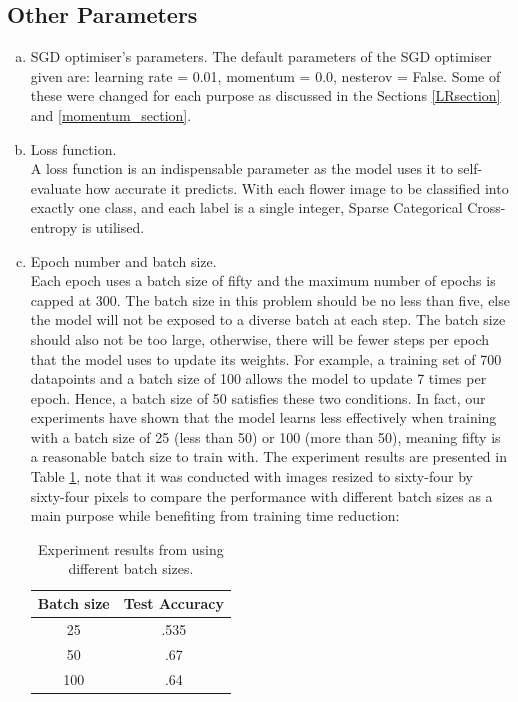 \documentclass[]{article}
\begin{document}
\subsection{Other Parameters}  \label{other_parameter}

\begin{enumerate}[(a)]
    \item SGD optimiser's parameters. \newline
    The default parameters of the SGD optimiser given are: learning rate = 0.01, momentum = 0.0, nesterov = False. Some of these were changed for each purpose as discussed in the Sections \ref{LRsection} and \ref{momentum_section}.  

    \item Loss function. \\
    A loss function is an indispensable parameter as the model uses it to self-evaluate how accurate it predicts. With each flower image to be classified into exactly one class, and each label is a single integer, Sparse Categorical Cross-entropy is utilised.


    \item Epoch number and batch size.  \\
    Each epoch uses a batch size of fifty and the maximum number of epochs is capped at 300. The batch size in this problem should be no less than five, else the model will not be exposed to a diverse batch at each step. The batch size should also not be too large, otherwise, there will be fewer steps per epoch that the model uses to update its weights. For example, a training set of 700 datapoints and a batch size of 100 allows the model to update 7 times per epoch. Hence, a batch size of 50 satisfies these two conditions. In fact, our experiments have shown that the model learns less effectively when training with a batch size of 25 (less than 50) or 100 (more than 50), meaning fifty is a reasonable batch size to train with. The experiment results are presented in Table \ref{tab:BatchSizeExperiments}, note that it was conducted with images resized to sixty-four by sixty-four pixels to compare the performance with different batch sizes as a main purpose while benefiting from training time reduction:
    
    \begin{table}[H]
    \centering
    \begin{tabular}{ | c | c | }
        \hline
        Batch size & Test Accuracy  \\ 
      \hline
        25 & .535 \\  
      \hline
        50 & .67 \\  
      \hline
        100 & .64 \\  
      \hline
    \end{tabular}
    \caption{Experiment results from using different batch sizes.}
    \label{tab:BatchSizeExperiments}
    \end{table}
    

\end{enumerate}
\end{document}
